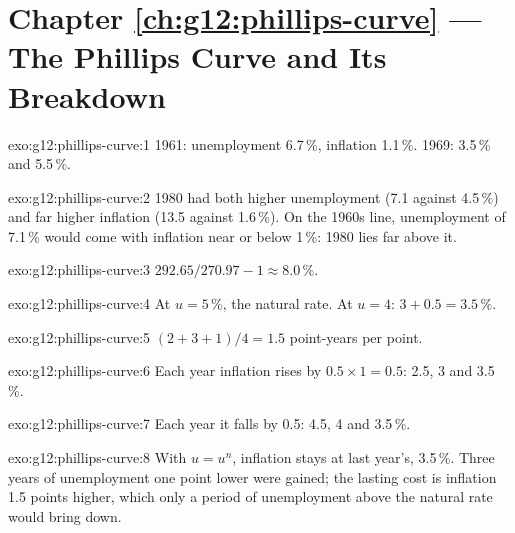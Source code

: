 \section*{Chapter \ref{ch:g12:phillips-curve} --- The Phillips Curve and Its Breakdown}

\begin{solution}{exo:g12:phillips-curve:1}
1961: unemployment 6.7\,\%, inflation 1.1\,\%. 1969: 3.5\,\% and 5.5\,\%.
\end{solution}

\begin{solution}{exo:g12:phillips-curve:2}
1980 had both higher unemployment (7.1 against 4.5\,\%) and far higher inflation (13.5 against 1.6\,\%). On the 1960s line, unemployment of 7.1\,\% would come with inflation
near or below 1\,\%: 1980 lies far above it.
\end{solution}

\begin{solution}{exo:g12:phillips-curve:3}
$292.65/270.97 - 1 \approx 8.0\,\%$.
\end{solution}

\begin{solution}{exo:g12:phillips-curve:4}
At $u = 5$\,\%, the natural rate. At $u = 4$: $3 + 0.5 = 3.5\,\%$.
\end{solution}

\begin{solution}{exo:g12:phillips-curve:5}
$(2 + 3 + 1)/4 = 1.5$ point-years per point.
\end{solution}

\begin{solution}{exo:g12:phillips-curve:6}
Each year inflation rises by $0.5 \times 1 = 0.5$: 2.5, 3 and 3.5\,\%.
\end{solution}

\begin{solution}{exo:g12:phillips-curve:7}
Each year it falls by 0.5: 4.5, 4 and 3.5\,\%.
\end{solution}

\begin{solution}{exo:g12:phillips-curve:8}
With $u = u^n$, inflation stays at last year's, 3.5\,\%. Three years of unemployment one point lower were gained; the lasting cost is inflation 1.5 points higher, which only
a period of unemployment above the natural rate would bring down.
\end{solution}

